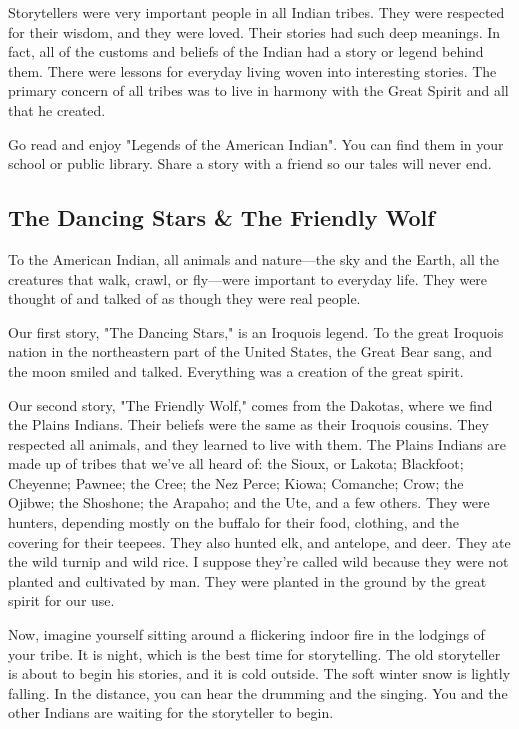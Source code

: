 Storytellers were very important people in all Indian tribes. They were respected for their wisdom, and they were loved. Their stories had such deep meanings. In fact, all of the customs and beliefs of the Indian had a story or legend behind them. There were lessons for everyday living woven into interesting stories. The primary concern of all tribes was to live in harmony with the Great Spirit and all that he created.

Go read and enjoy "Legends of the American Indian". You can find them in your school or public library. Share a story with a friend so our tales will never end.


\subsection{The Dancing Stars \& The Friendly Wolf}

To the American Indian, all animals and nature—the sky and the Earth, all the creatures that walk, crawl, or fly—were important to everyday life. They were thought of and talked of as though they were real people.

Our first story, "The Dancing Stars," is an Iroquois legend. To the great Iroquois nation in the northeastern part of the United States, the Great Bear sang, and the moon smiled and talked. Everything was a creation of the great spirit.

Our second story, "The Friendly Wolf," comes from the Dakotas, where we find the Plains Indians. Their beliefs were the same as their Iroquois cousins. They respected all animals, and they learned to live with them. The Plains Indians are made up of tribes that we've all heard of: the Sioux, or Lakota; Blackfoot; Cheyenne; Pawnee; the Cree; the Nez Perce; Kiowa; Comanche; Crow; the Ojibwe; the Shoshone; the Arapaho; and the Ute, and a few others. They were hunters, depending mostly on the buffalo for their food, clothing, and the covering for their teepees. They also hunted elk, and antelope, and deer. They ate the wild turnip and wild rice. I suppose they're called wild because they were not planted and cultivated by man. They were planted in the ground by the great spirit for our use.

Now, imagine yourself sitting around a flickering indoor fire in the lodgings of your tribe. It is night, which is the best time for storytelling. The old storyteller is about to begin his stories, and it is cold outside. The soft winter snow is lightly falling. In the distance, you can hear the drumming and the singing. You and the other Indians are waiting for the storyteller to begin.

